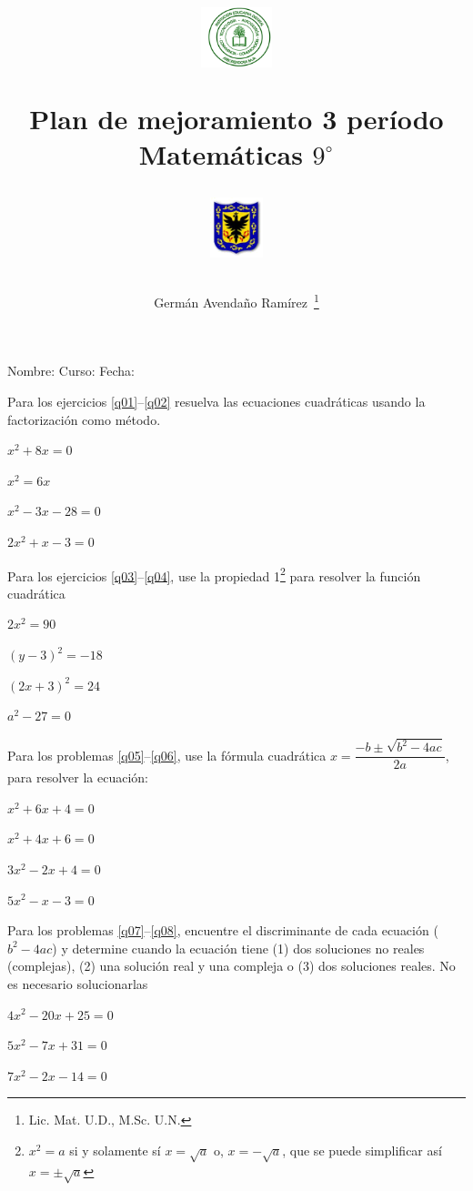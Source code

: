 \documentclass[letterpaper]{article}
\author{Germ\'an Avenda\~no Ram\'irez~\thanks{Lic. Mat. U.D., M.Sc. U.N.}}
\title{\begin{minipage}{.2\textwidth}
\includegraphics[height=1.75cm]{Images/logo-colegio.png}\end{minipage}
\begin{minipage}{.55\textwidth}
\begin{center}
Plan de mejoramiento 3 período\\
Matemáticas $9^{\circ}$
\end{center}
\end{minipage}\hfill
\begin{minipage}{.2\textwidth}
\includegraphics[height=1.75cm]{Images/logo-sed.png} 
\end{minipage}}
\date{}
\begin{document}
\maketitle
Nombre: \hrulefill Curso: \underline{\hspace*{44pt}} Fecha: \underline{\hspace*{2.5cm}}
\begin{multicols}{2}
Para los ejercicios \ref{q01}--\ref{q02} resuelva las ecuaciones cuadráticas usando la factorización como método.
\begin{enumerate}
\begin{multicols}{2}
\item \label{q01} $x^{2}+8x=0$
\item $x^{2}=6x$
\item $x^{2}-3x-28=0$
\item \label{q02} $2x^{2}+x-3=0$
\end{multicols}
Para los ejercicios \ref{q03}--\ref{q04}, use la propiedad 1\footnote{$x^{2}=a$ si y solamente sí $x=\sqrt{a}$ o, $x=-\sqrt{a}$, que se puede simplificar así $x=\pm\sqrt{a}$} para resolver la función cuadrática
\begin{multicols}{2}
\item \label{q03} $2x^{2}=90$
\item $(y-3)^{2}=-18$
\item $(2x+3)^{2}=24$
\item \label{q04} $a^{2}-27=0$
\end{multicols}
Para los problemas \ref{q05}--\ref{q06}, use la fórmula cuadrática $x=\dfrac{-b\pm\sqrt{b^{2}-4ac}}{2a}$, para resolver la ecuación:
\begin{multicols}{2}
\item \label{q05} $x^{2}+6x+4=0$
\item $x^{2}+4x+6=0$
\item $3x^{2}-2x+4=0$
\item \label{q06} $5x^{2}-x-3=0$
\end{multicols}
Para los problemas \ref{q07}--\ref{q08}, encuentre el discriminante de cada ecuación ($b^{2}-4ac$) y determine cuando la ecuación tiene (1) dos soluciones no reales (complejas), (2) una solución real y una compleja  o (3) dos soluciones reales. No es necesario solucionarlas
\begin{multicols}{2}
\item \label{q07} $4x^{2}-20x+25=0$
\item $5x^{2}-7x+31=0$
\item $7x^{2}-2x-14=0$

\end{multicols}
\end{enumerate}
\end{multicols}
\end{document}
